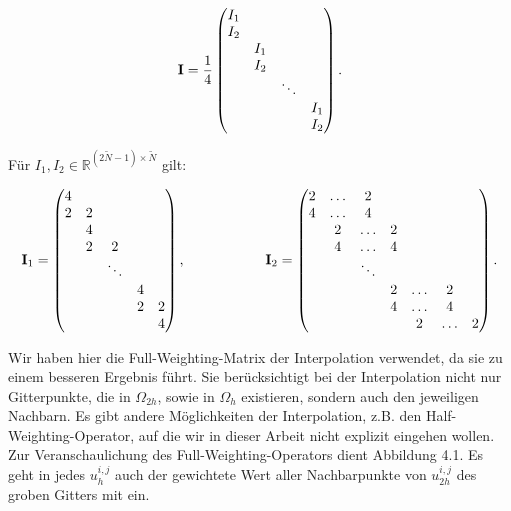 \begin{equation}
{\textbf{I}} = \frac {1} {4}
\begin{pmatrix}
I_{1} & & &\\
I_{2} & & &\\
& I_{1} & &\\
& I_{2} & &\\
& & \ddots &\\
& & & I_{1}\\
& & & I_{2}
\end{pmatrix}.
\end{equation}

Für $I_{1},I_{2} \in \mathbb{R}^{(2\tilde N - 1) \times \tilde N}$ gilt:

\begin{equation}
{\textbf{I}}_{1} =
\begin{pmatrix}
4 & & & &\\
2 & 2 & & &\\
& 4 & & &\\
& 2 & 2 & &\\
& & \ddots & &\\
& & & 4 &\\
& & & 2 & 2\\
& & & & 4\\
\end{pmatrix},
\hspace{2cm}
{\textbf{I}}_{2} =
\begin{pmatrix}
2 & \hdots & 2 & & & &\\
4 & \hdots & 4 & & & &\\
& 2 & \hdots & 2 & & &\\
& 4 & \hdots & 4 & & &\\
& & \ddots & & & &\\
& & & 2 & \hdots & 2 &\\
& & & 4 & \hdots & 4 &\\
& & & & 2 & \hdots & 2\\
\end{pmatrix}.
\end{equation}

Wir haben hier die Full-Weighting-Matrix der Interpolation verwendet, da sie zu einem besseren Ergebnis führt. Sie berücksichtigt bei der Interpolation nicht nur Gitterpunkte, die in $\Omega_{2h}$, sowie in $\Omega_{h}$ existieren, sondern auch den jeweiligen Nachbarn. Es gibt andere Möglichkeiten der Interpolation, z.B. den Half-Weighting-Operator, auf die wir in dieser Arbeit nicht explizit eingehen wollen. Zur Veranschaulichung des Full-Weighting-Operators dient Abbildung 4.1. Es geht in jedes $u^{i,j}_{h}$ auch der gewichtete Wert aller Nachbarpunkte von $u^{i,j}_{2h}$ des groben Gitters mit ein.

